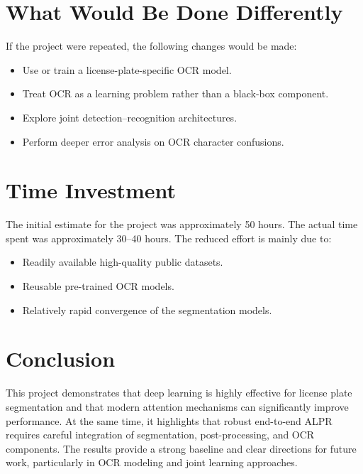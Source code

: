 \documentclass[11pt,a4paper]{article}
\begin{document}
\section{What Would Be Done Differently}

If the project were repeated, the following changes would be made:
\begin{itemize}
    \item Use or train a license-plate-specific OCR model.
    \item Treat OCR as a learning problem rather than a black-box component.
    \item Explore joint detection--recognition architectures.
    \item Perform deeper error analysis on OCR character confusions.
\end{itemize}

\section{Time Investment}

The initial estimate for the project was approximately 50 hours. The actual time spent was approximately 30--40 hours. The reduced effort is mainly due to:
\begin{itemize}
    \item Readily available high-quality public datasets.
    \item Reusable pre-trained OCR models.
    \item Relatively rapid convergence of the segmentation models.
\end{itemize}

\section{Conclusion}

This project demonstrates that deep learning is highly effective for license plate segmentation and that modern attention mechanisms can significantly improve performance. At the same time, it highlights that robust end-to-end ALPR requires careful integration of segmentation, post-processing, and OCR components. The results provide a strong baseline and clear directions for future work, particularly in OCR modeling and joint learning approaches.


% 
\end{document}
